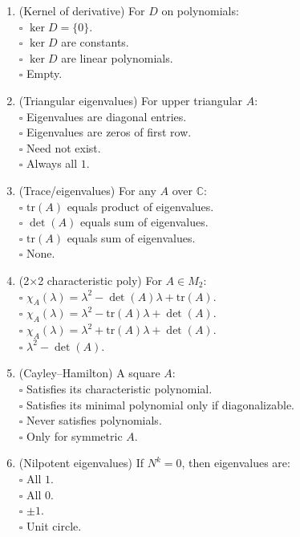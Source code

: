 \documentclass[11pt]{article}
\theoremstyle{upright}
\begin{document}
\begin{enumerate}
\item (Kernel of derivative) For $D$ on polynomials:\\
\(\square\) $\ker D=\{0\}$.\\
\(\square\) $\ker D$ are constants.\\
\(\square\) $\ker D$ are linear polynomials.\\
\(\square\) Empty.

\item (Triangular eigenvalues) For upper triangular $A$:\\
\(\square\) Eigenvalues are diagonal entries.\\
\(\square\) Eigenvalues are zeros of first row.\\
\(\square\) Need not exist.\\
\(\square\) Always all $1$.

\item (Trace/eigenvalues) For any $A$ over $\mathbb{C}$:\\
\(\square\) $\mathrm{tr}(A)$ equals product of eigenvalues.\\
\(\square\) $\det(A)$ equals sum of eigenvalues.\\
\(\square\) $\mathrm{tr}(A)$ equals sum of eigenvalues.\\
\(\square\) None.

\item (2×2 characteristic poly) For $A\in M_2$:\\
\(\square\) $\chi_A(\lambda)=\lambda^2-\det(A)\lambda+\mathrm{tr}(A)$.\\
\(\square\) $\chi_A(\lambda)=\lambda^2-\mathrm{tr}(A)\lambda+\det(A)$.\\
\(\square\) $\chi_A(\lambda)=\lambda^2+\mathrm{tr}(A)\lambda+\det(A)$.\\
\(\square\) $\lambda^2-\det(A)$.

\item (Cayley–Hamilton) A square $A$:\\
\(\square\) Satisfies its characteristic polynomial.\\
\(\square\) Satisfies its minimal polynomial only if diagonalizable.\\
\(\square\) Never satisfies polynomials.\\
\(\square\) Only for symmetric $A$.

\item (Nilpotent eigenvalues) If $N^k=0$, then eigenvalues are:\\
\(\square\) All $1$.\\
\(\square\) All $0$.\\
\(\square\) $\pm 1$.\\
\(\square\) Unit circle.


\end{enumerate}
\end{document}
